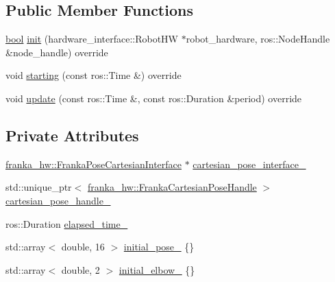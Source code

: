 \subsection*{Public Member Functions}
\begin{DoxyCompactItemize}
\item 
\hyperlink{classbool}{bool} \hyperlink{classfranka__example__controllers_1_1ElbowExampleController_ae289eee8c389d5b2d9e2f2cf13fcc475}{init} (hardware\+\_\+interface\+::\+Robot\+HW $\ast$robot\+\_\+hardware, ros\+::\+Node\+Handle \&node\+\_\+handle) override
\item 
void \hyperlink{classfranka__example__controllers_1_1ElbowExampleController_a0ed0bd6a0db321eda30ddf0f038021df}{starting} (const ros\+::\+Time \&) override
\item 
void \hyperlink{classfranka__example__controllers_1_1ElbowExampleController_a0f3e4ef04d7d4eba6019ae68c621a3a0}{update} (const ros\+::\+Time \&, const ros\+::\+Duration \&period) override
\end{DoxyCompactItemize}
\subsection*{Private Attributes}
\begin{DoxyCompactItemize}
\item 
\hyperlink{classfranka__hw_1_1FrankaPoseCartesianInterface}{franka\+\_\+hw\+::\+Franka\+Pose\+Cartesian\+Interface} $\ast$ \hyperlink{classfranka__example__controllers_1_1ElbowExampleController_a77b32f28520c2db59b4fd7209c50d578}{cartesian\+\_\+pose\+\_\+interface\+\_\+}
\item 
std\+::unique\+\_\+ptr$<$ \hyperlink{classfranka__hw_1_1FrankaCartesianPoseHandle}{franka\+\_\+hw\+::\+Franka\+Cartesian\+Pose\+Handle} $>$ \hyperlink{classfranka__example__controllers_1_1ElbowExampleController_a911a7a82e55ba8f023ec8c0a9c8d2bd9}{cartesian\+\_\+pose\+\_\+handle\+\_\+}
\item 
ros\+::\+Duration \hyperlink{classfranka__example__controllers_1_1ElbowExampleController_adbacbe4e9d5314fc0a881f16b7ffa3c2}{elapsed\+\_\+time\+\_\+}
\item 
std\+::array$<$ double, 16 $>$ \hyperlink{classfranka__example__controllers_1_1ElbowExampleController_a93ff73dad84295cd4c822b6bb843bc3c}{initial\+\_\+pose\+\_\+} \{\}
\item 
std\+::array$<$ double, 2 $>$ \hyperlink{classfranka__example__controllers_1_1ElbowExampleController_a5addb6a766aa1ad5e193796976307ef1}{initial\+\_\+elbow\+\_\+} \{\}
\end{DoxyCompactItemize}


